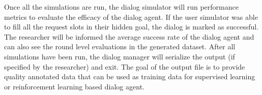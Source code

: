 Once all the simulations are run, the dialog simulator will run performance metrics to evaluate the efficacy of the dialog agent. If the user simulator was able to fill all the request slots in their hidden goal, the dialog is marked as successful. The researcher will be informed the average success rate of the dialog agent and can also see the round level evaluations in the generated dataset. After all simulations have been run, the dialog manager will serialize the output (if specified by the researcher) and exit. The goal of the output file is to provide quality annotated data that can be used as training data for supervised learning or reinforcement learning based dialog agent. 




